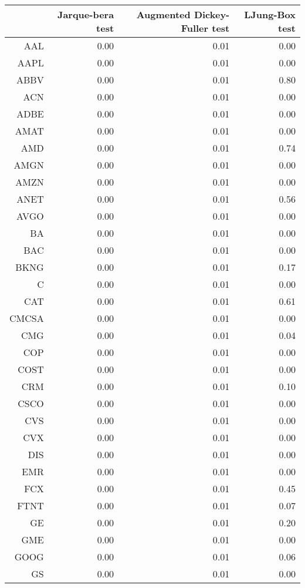 \begin{table}[ht]
\centering
\begin{tabular}{rrrr}
  \hline
 & Jarque-bera test & Augmented Dickey-Fuller test & LJung-Box test \\ 
  \hline
AAL & 0.00 & 0.01 & 0.00 \\ 
  AAPL & 0.00 & 0.01 & 0.00 \\ 
  ABBV & 0.00 & 0.01 & 0.80 \\ 
  ACN & 0.00 & 0.01 & 0.00 \\ 
  ADBE & 0.00 & 0.01 & 0.00 \\ 
  AMAT & 0.00 & 0.01 & 0.00 \\ 
  AMD & 0.00 & 0.01 & 0.74 \\ 
  AMGN & 0.00 & 0.01 & 0.00 \\ 
  AMZN & 0.00 & 0.01 & 0.00 \\ 
  ANET & 0.00 & 0.01 & 0.56 \\ 
  AVGO & 0.00 & 0.01 & 0.00 \\ 
  BA & 0.00 & 0.01 & 0.00 \\ 
  BAC & 0.00 & 0.01 & 0.00 \\ 
  BKNG & 0.00 & 0.01 & 0.17 \\ 
  C & 0.00 & 0.01 & 0.00 \\ 
  CAT & 0.00 & 0.01 & 0.61 \\ 
  CMCSA & 0.00 & 0.01 & 0.00 \\ 
  CMG & 0.00 & 0.01 & 0.04 \\ 
  COP & 0.00 & 0.01 & 0.00 \\ 
  COST & 0.00 & 0.01 & 0.00 \\ 
  CRM & 0.00 & 0.01 & 0.10 \\ 
  CSCO & 0.00 & 0.01 & 0.00 \\ 
  CVS & 0.00 & 0.01 & 0.00 \\ 
  CVX & 0.00 & 0.01 & 0.00 \\ 
  DIS & 0.00 & 0.01 & 0.00 \\ 
  EMR & 0.00 & 0.01 & 0.00 \\ 
  FCX & 0.00 & 0.01 & 0.45 \\ 
  FTNT & 0.00 & 0.01 & 0.07 \\ 
  GE & 0.00 & 0.01 & 0.20 \\ 
  GME & 0.00 & 0.01 & 0.00 \\ 
  GOOG & 0.00 & 0.01 & 0.06 \\ 
  GS & 0.00 & 0.01 & 0.00 \\ 

\end{tabular}
\end{table}
